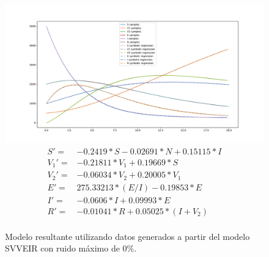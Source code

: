 \begin{figure}[h]
    \centering
    \includegraphics[width=\textwidth]{"figures/final_plot_SVVEIR_0.0.pdf"}
    \begin{align*}
        S' =   & -0.2419 * S -0.02691 * N + 0.15115 * I \\
        V_1' = & -0.21811 * V_1 + 0.19669 * S           \\
        V_2' = & -0.06034 * V_2 + 0.20005 * V_1         \\
        E' =   & 275.33213 * (E / I) -0.19853 * E       \\
        I' =   & -0.0606 * I + 0.09993 * E              \\
        R' =   & -0.01041 * R + 0.05025 * (I + V_2)     \\
    \end{align*}
    \caption{Modelo resultante utilizando datos generados a partir del modelo SVVEIR con ruido máximo de 0\%.}
    \label{fig:final_plot_SVVEIR_0.0}
\end{figure}

